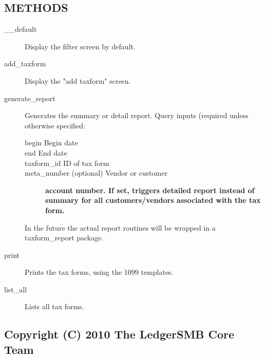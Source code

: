 \begin{description}
\subsection*{METHODS\label{LedgerSMB::Scripts::taxform_METHODS}}
\begin{description}

\item[{\_\_default}] \mbox{}

Display the filter screen by default.


\item[{add\_taxform}] \mbox{}

Display the "add taxform" screen.


\item[{generate\_report}] \mbox{}

Generates the summary or detail report.   Query inputs (required unless
otherwise specified:

\begin{description}

\item[{begin
Begin date}] \mbox{}
\item[{end
End date}] \mbox{}
\item[{taxform\_id
ID of tax form}] \mbox{}
\item[{meta\_number (optional) Vendor or customer}] \textbf{account number. If set, triggers detailed report instead of summary for all customers/vendors associated with the tax form.}\end{description}


In the future the actual report routines will be wrapped in a taxform\_report
package.


\item[{print}] \mbox{}

Prints the tax forms, using the 1099 templates.


\item[{list\_all}] \mbox{}

Lists all tax forms.

\end{description}
\subsection*{Copyright (C) 2010 The LedgerSMB Core Team\label{LedgerSMB::Scripts::taxform_Copyright_C_2010_The_LedgerSMB_Core_Team}}



\end{description}
